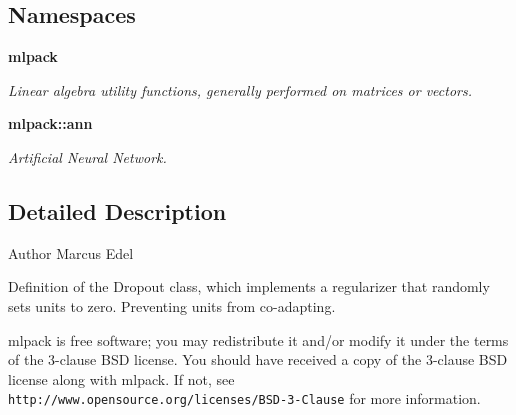 \subsection*{Namespaces}
\begin{DoxyCompactItemize}
\item 
 {\bf mlpack}
\begin{DoxyCompactList}\small\item\em Linear algebra utility functions, generally performed on matrices or vectors. \end{DoxyCompactList}\item 
 {\bf mlpack\+::ann}
\begin{DoxyCompactList}\small\item\em Artificial Neural Network. \end{DoxyCompactList}\end{DoxyCompactItemize}


\subsection{Detailed Description}
\begin{DoxyAuthor}{Author}
Marcus Edel
\end{DoxyAuthor}
Definition of the Dropout class, which implements a regularizer that randomly sets units to zero. Preventing units from co-\/adapting.

mlpack is free software; you may redistribute it and/or modify it under the terms of the 3-\/clause B\+SD license. You should have received a copy of the 3-\/clause B\+SD license along with mlpack. If not, see {\tt http\+://www.\+opensource.\+org/licenses/\+B\+S\+D-\/3-\/\+Clause} for more information. 